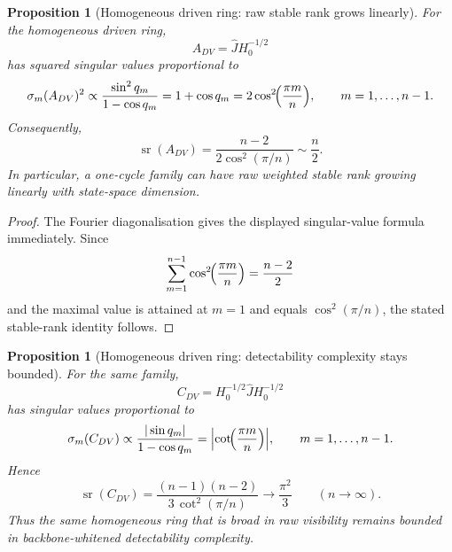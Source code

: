 \documentclass[11pt,a4paper]{article}
\numberwithin{equation}{section}
\theoremstyle{thmcompact}
\newtheorem{proposition}[theorem]{Proposition}
\theoremstyle{remark}
\begin{document}
\begin{proposition}[Homogeneous driven ring: raw stable rank grows linearly]
\label{prop:ring_raw_sr}
For the homogeneous driven ring,
\begin{equation}
A_{DV}=\widehat J H_0^{-1/2}
\end{equation}
has squared singular values proportional to
\begin{equation}
\sigma_m(A_{DV})^2 \propto \frac{\sin^2 q_m}{1-\cos q_m}=1+\cos q_m=2\cos^2\!\Bigl(\frac{\pi m}{n}\Bigr),
\qquad m=1,\dots,n-1.
\end{equation}
Consequently,
\begin{equation}
\operatorname{sr}(A_{DV})
=\frac{n-2}{2\cos^2(\pi/n)}
\sim \frac n2.
\end{equation}
In particular, a one-cycle family can have raw weighted stable rank growing linearly with state-space dimension.
\end{proposition}

\begin{proof}
The Fourier diagonalisation gives the displayed singular-value formula immediately. Since
\begin{equation}
\sum_{m=1}^{n-1}\cos^2\!\Bigl(\frac{\pi m}{n}\Bigr)=\frac{n-2}{2}
\end{equation}
and the maximal value is attained at \(m=1\) and equals \(\cos^2(\pi/n)\), the stated stable-rank identity follows.
\end{proof}

\begin{proposition}[Homogeneous driven ring: detectability complexity stays bounded]
\label{prop:ring_detectability_sr}
For the same family,
\begin{equation}
C_{DV}=H_0^{-1/2}\widehat J H_0^{-1/2}
\end{equation}
has singular values proportional to
\begin{equation}
\sigma_m(C_{DV}) \propto \frac{|\sin q_m|}{1-\cos q_m}=\Bigl|\cot\!\Bigl(\frac{\pi m}{n}\Bigr)\Bigr|,
\qquad m=1,\dots,n-1.
\end{equation}
Hence
\begin{equation}
\operatorname{sr}(C_{DV})
=\frac{(n-1)(n-2)}{3\,\cot^2(\pi/n)}
\longrightarrow \frac{\pi^2}{3}
\qquad (n\to\infty).
\end{equation}
Thus the same homogeneous ring that is broad in raw visibility remains bounded in backbone-whitened detectability complexity.
\end{proposition}
\end{document}
